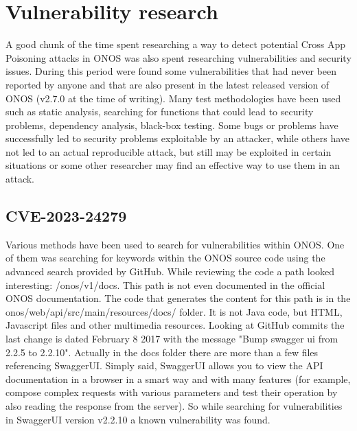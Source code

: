 \documentclass[a4paper,10pt]{memoir}
\begin{document}
\clearpage


\section{Vulnerability research}

A good chunk of the time spent researching a way to detect potential Cross App Poisoning attacks in ONOS was also spent researching vulnerabilities and security issues. During this period were found some vulnerabilities that had never been reported by anyone and that are also present in the latest released version of ONOS (v2.7.0 at the time of writing). Many test methodologies have been used such as static analysis, searching for functions that could lead to security problems, dependency analysis, black-box testing. Some bugs or problems have successfully led to security problems exploitable by an attacker, while others have not led to an actual reproducible attack, but still may be exploited in certain situations or some other researcher may find an effective way to use them in an attack.

\subsection{CVE-2023-24279}

Various methods have been used to search for vulnerabilities within ONOS. One of them was searching for keywords within the ONOS source code using the advanced search provided by GitHub. While reviewing the code a path looked interesting: /onos/v1/docs. This path is not even documented in the official ONOS documentation. The code that generates the content for this path is in the onos/web/api/src/main/resources/docs/ folder. It is not Java code, but HTML, Javascript files and other multimedia resources. Looking at GitHub commits the last change is dated February 8 2017 with the message "Bump swagger ui from 2.2.5 to 2.2.10". Actually in the docs folder there are more than a few files referencing SwaggerUI. Simply said, SwaggerUI allows you to view the API documentation in a browser in a smart way and with many features (for example, compose complex requests with various parameters and test their operation by also reading the response from the server). So while searching for vulnerabilities in SwaggerUI version v2.2.10 a known vulnerability was found.
\end{document}
